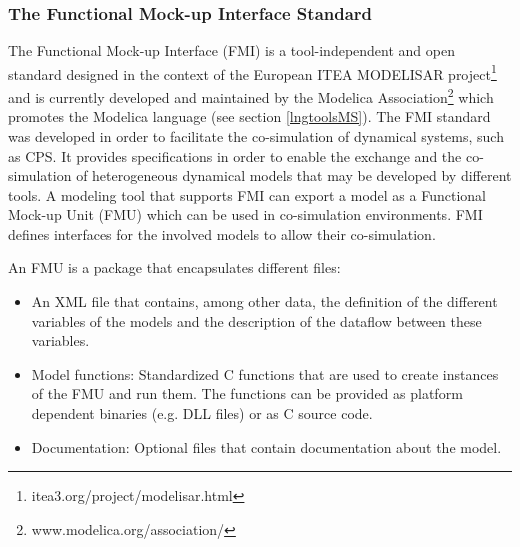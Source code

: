 \subsubsection{The Functional Mock-up Interface Standard}

The Functional Mock-up Interface (FMI) is a tool-independent and open standard designed in the context of the European ITEA MODELISAR project\footnote{itea3.org/project/modelisar.html} and is currently developed and maintained by the Modelica Association\footnote{www.modelica.org/association/} which promotes the Modelica language (see section \ref{lngtoolsMS}). The FMI standard was developed in order to facilitate the co-simulation of dynamical systems, such as CPS. It provides specifications in order to enable the exchange and the co-simulation of heterogeneous dynamical models that may be developed by different tools. A modeling tool that supports FMI can export a model as a Functional Mock-up Unit (FMU) which can be used in co-simulation environments. FMI defines interfaces for the involved models to allow their co-simulation.



An FMU is a package that encapsulates different files:

\begin{itemize}
\item An XML file that contains, among other data, the definition of the different variables of the models and the description of the dataflow between these variables. 
\item Model functions: Standardized C functions that are used to create instances of the FMU and run them. The functions can be provided as platform dependent binaries (e.g. DLL files) or as C source code.
\item Documentation: Optional files that contain documentation about the model.
\end{itemize}

